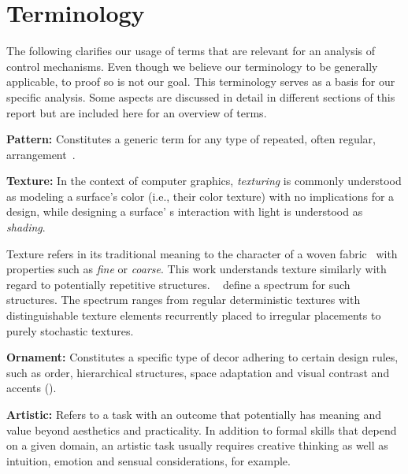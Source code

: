 
\section{Terminology}

The following clarifies our usage of terms that are relevant for an analysis of control mechanisms. Even though we believe our terminology to be generally applicable, to proof so is not our goal. This terminology serves as a basis for our specific analysis. Some aspects are discussed in detail in different sections of this report but are included here for an overview of terms.

\textbf{Pattern:} Constitutes a generic term for any type of repeated, often regular, arrangement~\cite{oed_2017}.

\textbf{Texture:} \label{par:taxo_terminology_texture}In the context of computer graphics, \textit{texturing} is commonly understood as modeling a surface's color (i.e., their color texture) with no implications for a design, while designing a surface' s interaction with light is understood as \textit{shading}. 

Texture refers in its traditional meaning to the character of a woven fabric~\cite{oed_2017} with properties such as \textit{fine} or \textit{coarse}. This work understands texture similarly with regard to potentially repetitive structures. \citeauthor*{lin_2006_qeo}~\cite{lin_2006_qeo} define a spectrum for such structures. The spectrum ranges from regular deterministic textures with distinguishable texture elements recurrently placed to irregular placements to purely stochastic textures.


\textbf{Ornament:} Constitutes a specific type of decor adhering to certain design rules, such as order, hierarchical structures, space adaptation and visual contrast and accents ().

\textbf{Artistic:} Refers to a task with an outcome that potentially has meaning and value beyond aesthetics and practicality. In addition to formal skills that depend on a given domain, an artistic task usually requires creative thinking as well as intuition, emotion and sensual considerations, for example.

